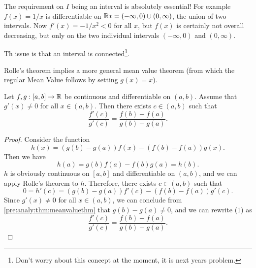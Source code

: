 \documentclass[10pt, a4paper]{article}
\begin{document}
The requirement on $I$ being an interval is absolutely essential!
For example $f(x) = 1 /x$ is differentiable on $\mathbb{R}* = (-\infty, 0) \cup (0, \infty)$,
the union of two intervals.
Now $f'(x) = -1 / x ^ 2 < 0$ for all $x$,
but $f(x)$ is certainly not overall decreasing,
but only on the two individual intervals $(-\infty, 0)$ and $(0, \infty)$.

Th issue is that an interval is connected\footnote{Don't worry about this concept at the moment,
it is next years problem.}.

Rolle's theorem implies a more general mean value theorem
(from which the regular Mean Value follows by setting $g(x) = x$).

\begin{theorem}\label{pre:analy:thm:genmeanvalthm}
    Let $f, g : [a, b] \rightarrow \mathbb{R}$ be continuous and differentiable on $(a, b)$.
    Assume that $g'(x) \neq 0$ for all $x \in (a, b)$.
    Then there exists $c \in (a, b)$ such that
    \[
    \frac{f'(c)}{g'(c)} = \frac{f(b) - f(a)}{g(b) - g(a)}.
    \]
    \begin{center}
    \end{center}
    \hfill
    \begin{proof}
        Consider the function
        \[
        h(x) = (g(b) - g(a))f(x) - (f(b) - f(a))g(x).
        \]
        Then we have
        \[
        h(a) = g(b)f(a) - f(b)g(a) = h(b).
        \]
        $h$ is obviously continuous on $[a, b]$ and differentiable on $(a, b)$,
        and we can apply Rolle's theorem to $h$.
        Therefore,
        there exists $c \in (a, b)$ such that
        \begin{equation}
            0 = h'(c) = (g(b) - g(a))f'(c) - (f(b) - f(a))g'(c).
        \end{equation}
        Since $g'(x) \neq 0$ for all $x \in (a, b)$,
        we can conclude from \autoref{pre:analy:thm:meanvaluethm} that $g(b) - g(a) \neq 0$,
        and we can rewrite ($1$) as
        \[
        \frac{f'(c)}{g'(c)} = \frac{f(b) - f(a)}{g(b) - g(a)}.
        \]
    \end{proof}
\end{theorem}
\end{document}
